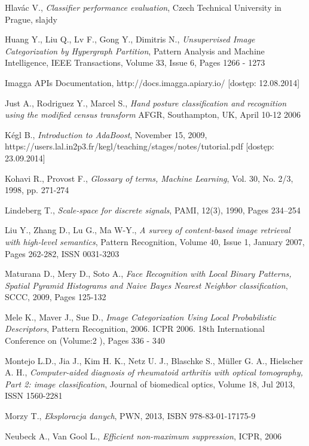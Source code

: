 \begin{thebibliography}{100}
 Hlavác V., \emph{Classifier performance evaluation}, Czech Technical University in Prague, slajdy

 Huang Y., Liu Q., Lv F., Gong Y., Dimitris N., \emph{Unsupervised Image Categorization by Hypergraph Partition}, Pattern Analysis and Machine Intelligence, IEEE Transactions, Volume 33, Issue 6, Pages 1266 - 1273

 Imagga APIs Documentation, http://docs.imagga.apiary.io/ [dostęp: 12.08.2014]

 Just A., Rodriguez Y., Marcel S., \emph{Hand posture classification and recognition using the modified census transform} AFGR, Southampton, UK, April 10-12 2006

 Kégl B., \emph{Introduction to AdaBoost}, November 15, 2009, https://users.lal.in2p3.fr/kegl/teaching/stages/notes/tutorial.pdf [dostęp: 23.09.2014]

 Kohavi R., Provost F., \emph{Glossary of terms, Machine Learning}, Vol. 30, No. 2/3, 1998, pp. 271-274

 Lindeberg T., \emph{Scale-space for discrete signals}, PAMI, 12(3), 1990, Pages 234–254

 Liu Y., Zhang D., Lu G., Ma W-Y., \emph{A survey of content-based image retrieval with high-level semantics}, Pattern Recognition, Volume 40, Issue 1, January 2007, Pages 262-282, ISSN 0031-3203

 Maturana D., Mery D., Soto A., \emph{Face Recognition with Local Binary Patterns, Spatial Pyramid Histograms and Naive Bayes Nearest Neighbor classification}, SCCC, 2009, Pages 125-132

 Mele K., Maver J., Sue D., \emph{Image Categorization Using Local Probabilistic Descriptors}, Pattern Recognition, 2006. ICPR 2006. 18th International Conference on  (Volume:2 ), Pages 336 - 340

 Montejo L.D., Jia J., Kim H. K., Netz U. J., Blaschke S., Müller G. A., Hielscher A. H., \emph{Computer-aided diagnosis of rheumatoid arthritis with optical tomography, Part 2: image classification}, Journal of biomedical optics, Volume 18, Jul 2013, ISSN 1560-2281

 Morzy T., \emph{Eksploracja danych}, PWN, 2013, ISBN 978-83-01-17175-9

 Neubeck A., Van Gool L., \emph{Efficient non-maximum suppression}, ICPR, 2006


\end{thebibliography}

